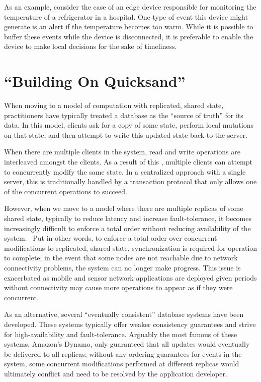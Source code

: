 \documentclass[nocopyrightspace, preprint]{sigplanconf}
\theoremstyle{definition}
\theoremstyle{remark}
\begin{document}
As an example, consider the case of an edge device responsible for monitoring the temperature of a refrigerator in a hospital.  One type of event this device might generate is an alert if the temperature becomes too warm.  While it is possible to buffer these events while the device is disconnected, it is preferable to enable the device to make local decisions for the sake of timeliness. 

\section{``Building On Quicksand''}
When moving to a model of computation with replicated, shared state, practitioners have typically treated a database as the ``source of truth'' for its data.  In this model, clients ask for a copy of some state, perform local mutations on that state, and then attempt to write this updated state back to the server.

When there are multiple clients in the system, read and write operations are interleaved amongst the clients.  As a result of this , multiple clients can attempt to concurrently modify the same state.  In a centralized approach with a single server, this is traditionally handled by a transaction protocol that only allows one of the concurrent operations to succeed.

However, when we move to a model where there are multiple replicas of some shared state, typically to reduce latency and increase fault-tolerance, it becomes increasingly difficult to enforce a total order without reducing availability of the system.~\cite{gilbert2002brewer}  Put in other words, to enforce a total order over concurrent modifications to replicated, shared state, synchronization is required for operation to complete; in the event that some nodes are not reachable due to network connectivity problems, the system can no longer make progress.  This issue is exacerbated as mobile and sensor network applications are deployed given periods without connectivity may cause more operations to appear as if they were concurrent.

As an alternative, several ``eventually consistent'' database systems have been developed. These systems typically offer weaker consistency guarantees and strive for high-availability and fault-tolerance.   Arguably the most famous of these systems, Amazon's Dynamo, only guaranteed that all updates would eventually be delivered to all replicas; without any ordering guarantees for events in the system, some concurrent modifications performed at different replicas would ultimately conflict and need to be resolved by the application developer.~\cite{decandia2007dynamo}
\end{document}
